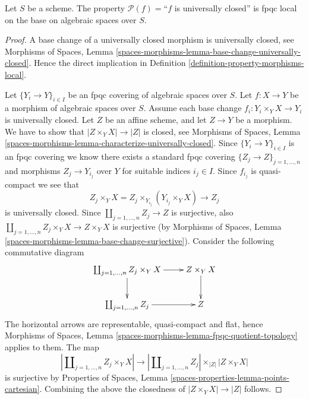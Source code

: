 \begin{lemma}
\label{lemma-descending-property-universally-closed}
Let $S$ be a scheme.
The property $\mathcal{P}(f) =$``$f$ is universally closed''
is fpqc local on the base on algebraic spaces over $S$.
\end{lemma}

\begin{proof}
A base change of a universally closed morphism is universally closed, see
Morphisms of Spaces,
Lemma \ref{spaces-morphisms-lemma-base-change-universally-closed}.
Hence the direct implication in
Definition \ref{definition-property-morphisms-local}.

\medskip\noindent
Let $\{Y_i \to Y\}_{i \in I}$ be an fpqc covering of algebraic spaces over $S$.
Let $f : X \to Y$ be a morphism of algebraic spaces over $S$.
Assume each base change $f_i : Y_i \times_Y X \to Y_i$ is universally closed.
Let $Z$ be an affine scheme, and let $Z \to Y$ be a morphism.
We have to show that $|Z \times_Y X| \to |Z|$ is closed, see
Morphisms of Spaces,
Lemma \ref{spaces-morphisms-lemma-characterize-universally-closed}.
Since $\{Y_i \to Y\}_{i \in I}$ is an fpqc covering we know there
exists a standard fpqc covering $\{Z_j \to Z\}_{j = 1, \ldots , n}$
and morphisms $Z_j \to Y_{i_j}$ over $Y$ for suitable indices $i_j \in I$.
Since $f_{i_j}$ is quasi-compact we see that
$$
Z_j \times_Y X
=
Z_j \times_{Y_{i_j}} (Y_{i_j} \times_Y X)
\longrightarrow
Z_j
$$
is universally closed.
Since $\coprod_{j = 1, \ldots, n} Z_j \to Z$ is surjective,
also $\coprod_{j = 1, \ldots, n} Z_j \times_Y X \to Z \times_Y X$ is
surjective (by
Morphisms of Spaces,
Lemma \ref{spaces-morphisms-lemma-base-change-surjective}).
Consider the following commutative diagram
$$
\xymatrix{
\coprod_{j = 1, \ldots, n} Z_j \times_Y X \ar[d] \ar[r] &
Z \times_Y X \ar[d] \\
\coprod_{j = 1, \ldots, n} Z_j \ar[r] &
Z
}
$$
The horizontal arrows are representable, quasi-compact and flat, hence
Morphisms of Spaces, Lemma \ref{spaces-morphisms-lemma-fpqc-quotient-topology}
applies to them. The map
$$
\left|\coprod\nolimits_{j = 1, \ldots, n} Z_j \times_Y X\right|
\longrightarrow
\left|\coprod\nolimits_{j = 1, \ldots, n} Z_j\right|
\times_{|Z|}
|Z \times_Y X|
$$
is surjective by
Properties of Spaces, Lemma \ref{spaces-properties-lemma-points-cartesian}.
Combining the above the closedness of $|Z \times_Y X| \to |Z|$ follows.
\end{proof}












